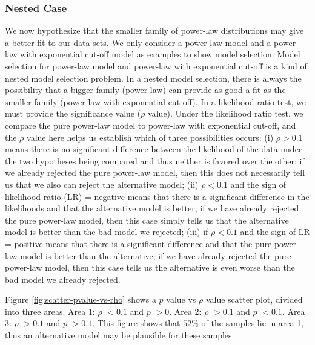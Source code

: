 \subsubsection{Nested Case}
We now hypothesize that the smaller family of power-law distributions may give a better fit to our data sets.
We only consider a power-law model and a power-law with exponential cut-off model as examples to show model selection.
Model selection for power-law model and power-law with exponential cut-off is a kind of nested model selection problem.
In a nested model selection,  there is always the possibility that a bigger family (power-law) can provide as good a fit as the smaller family (power-law with exponential cut-off).
In a likelihood ratio test, we must provide the significance value ($\rho$ value).
Under the likelihood ratio test, we compare the pure power-law model to power-law with exponential cut-off, and the $\rho$ value here helps us establish which of three possibilities occurs: (i) $\rho > 0.1$ means there is no significant difference between the likelihood of the data under the two hypotheses being compared and thus neither is favored over the other; if we already rejected the pure power-law model, then this does not necessarily tell us that we also can reject the alternative model; (ii) $\rho  < 0.1$ and the sign of likelihood ratio (LR) = negative means that there is a significant difference in the likelihoods and that the alternative model is better; if we have already rejected the pure power-law model, then this case simply tells us that the alternative model is better than the bad model we rejected; (iii) if $\rho < 0.1$ and the sign of LR = positive means that there is a significant difference and that the pure power-law model is better than the alternative; if we have already rejected the pure power-law model, then this case tells us the alternative is even worse than the bad model we already rejected.

Figure \ref{fig:scatter-pvalue-vs-rho} shows a $p$ value vs $\rho$ value scatter plot, divided into three areas.
Area 1: $\rho$ $<0.1$ and $p$ $>0$. 
Area 2: $\rho$ $>0.1$ and $p$ $<0.1$.
Area 3: $\rho$ $>0.1$ and $p$ $>0.1$. 
This figure shows that $52\%$ of the samples lie in area 1, thus an alternative model may be plausible for these samples.

